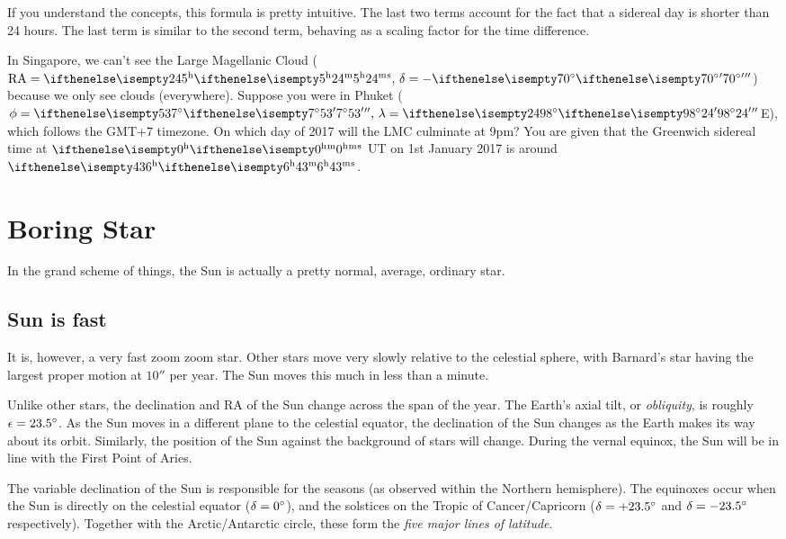\documentclass{article}
\begin{document}
If you understand the concepts, this formula is pretty intuitive. The last two terms account for the fact that a sidereal day is shorter than 24 hours. The last term is similar to the second term, behaving as a scaling factor for the time difference.

\begin{Exercise}
In Singapore, we can't see the Large Magellanic Cloud ($\RA=\hms{5}{24}{},\,\delta=-\sexg{70}{}{}$) because we only see clouds (everywhere). Suppose you were in Phuket ($\phi=\sexg{7}{53}{},\,\lambda=\sexg{98}{24}{}$E), which follows the GMT+7 timezone. On which day of 2017 will the LMC culminate at 9pm? You are given that the Greenwich sidereal time at $\hms{0}{}{}$ UT on 1st January 2017 is around $\hms{6}{43}{}$.
\end{Exercise}
\begin{Answer}
\end{Answer}

\section{Boring Star}
In the grand scheme of things, the Sun is actually a pretty normal, average, ordinary star. 

\subsection{Sun is fast}
It is, however, a very fast zoom zoom star. Other stars move very slowly relative to the celestial sphere, with Barnard's star having the largest proper motion at $10''$ per year. The Sun moves this much in less than a minute.

Unlike other stars, the declination and RA of the Sun change across the span of the year. The Earth's axial tilt, or \textit{obliquity}, is roughly $\epsilon = 23.5{}^{\circ}$. As the Sun moves in a different plane to the celestial equator, the declination of the Sun changes as the Earth makes its way about its orbit. Similarly, the position of the Sun against the background of stars will change. During the vernal equinox, the Sun will be in line with the First Point of Aries. 

The variable declination of the Sun is responsible for the seasons (as observed within the Northern hemisphere). The equinoxes occur when the Sun is directly on the celestial equator ($\delta = 0{}^{\circ}$), and the solstices on the Tropic of Cancer/Capricorn ($\delta = +23.5{}^{\circ}$ and $\delta = -23.5{}^{\circ}$ respectively). Together with the Arctic/Antarctic circle, these form the \textit{five major lines of latitude}.
\end{document}
